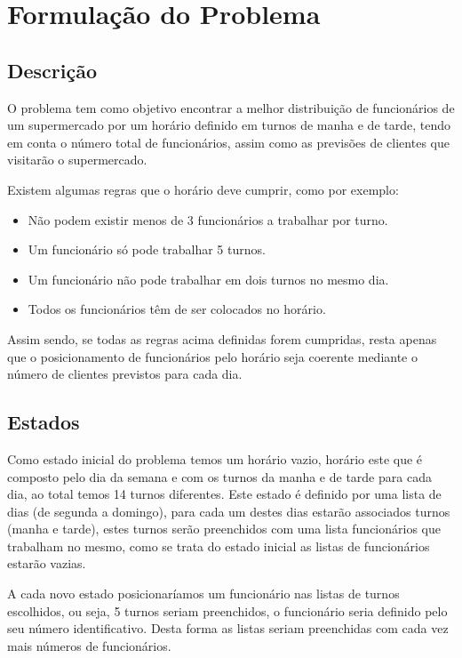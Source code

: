 \section{Formulação do Problema}
  \subsection*{\bf Descrição}
  
 O problema tem como objetivo encontrar a melhor distribuição de funcionários de um supermercado por um horário definido em turnos de manha e de tarde, tendo em conta o número total de funcionários, assim como as previsões de clientes que visitarão o supermercado.
 
\noindent Existem algumas regras que o horário deve cumprir, como por exemplo: 
\begin{itemize}
    \item Não podem existir menos de 3 funcionários a trabalhar por turno.
    \item Um funcionário só pode trabalhar 5 turnos.
    \item Um funcionário não pode trabalhar em dois turnos no mesmo dia.
    \item Todos os funcionários têm de ser colocados no horário.
\end{itemize}
 
 Assim sendo, se todas as regras acima definidas forem cumpridas, resta apenas que o posicionamento de funcionários pelo horário seja coerente mediante o número de clientes previstos para cada dia.
 
 \subsection*{\bf Estados}
 
 Como estado inicial do problema temos um horário vazio, horário este que é composto pelo dia da semana e com os turnos da manha e de tarde para cada dia, ao total temos 14 turnos diferentes. Este estado é definido por uma lista de dias (de segunda a domingo), para cada um destes dias estarão associados turnos (manha e tarde), estes turnos serão preenchidos com uma lista funcionários que trabalham no mesmo, como se trata do estado inicial as listas de funcionários estarão vazias.
 
 A cada novo estado posicionaríamos um funcionário nas listas de turnos escolhidos, ou seja, 5 turnos seriam preenchidos, o funcionário seria definido pelo seu número identificativo. Desta forma as listas seriam preenchidas com cada vez mais números de funcionários.
 
